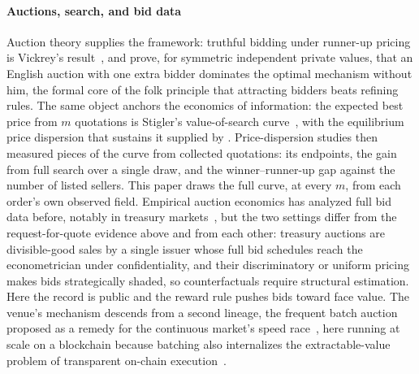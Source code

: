 \documentclass[11pt]{article}
\theoremstyle{plain}
\theoremstyle{definition}
\theoremstyle{remark}
\begin{document}
\paragraph{Auctions, search, and bid data} Auction theory supplies the framework: truthful bidding under runner-up pricing is Vickrey's result~\citep{vickrey1961counterspeculation}, and \citet{bulow1996auctions} prove, for symmetric independent private values, that an English auction with one extra bidder dominates the optimal mechanism without him, the formal core of the folk principle that attracting bidders beats refining rules. The same object anchors the economics of information: the expected best price from $m$ quotations is Stigler's value-of-search curve~\citep{stigler1961information}, with the equilibrium price dispersion that sustains it supplied by \citet{burdett1983dispersion}. Price-dispersion studies then measured pieces of the curve from collected quotations: \citet{pratt1979price} its endpoints, the gain from full search over a single draw, and \citet{baye2004price} the winner--runner-up gap against the number of listed sellers. This paper draws the full curve, at every $m$, from each order's own observed field. Empirical auction economics has analyzed full bid data before, notably in treasury markets~\citep{hortacsu2010mechanism,kastl2011discrete}, but the two settings differ from the request-for-quote evidence above and from each other: treasury auctions are divisible-good sales by a single issuer whose full bid schedules reach the econometrician under confidentiality, and their discriminatory or uniform pricing makes bids strategically shaded, so counterfactuals require structural estimation. Here the record is public and the reward rule pushes bids toward face value. The venue's mechanism descends from a second lineage, the frequent batch auction proposed as a remedy for the continuous market's speed race~\citep{budish2015hft,aquilina2022quantifying}, here running at scale on a blockchain because batching also internalizes the extractable-value problem of transparent on-chain execution~\citep{daian2020flashboys}.
\end{document}
